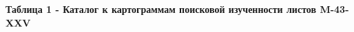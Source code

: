{\bfseries Таблица 1 - Каталог к картограммам поисковой изученности листов
M-43-XXV}

% 
% 
% 
% 
% 
% 
